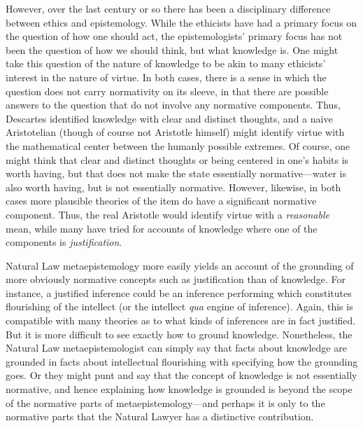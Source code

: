 However, over the last century or so there has been a disciplinary difference between ethics and epistemology. While the ethicists
have had a primary focus on the question of how one should act, the epistemologists' primary focus has not been the question of 
how we should think, but what knowledge is. One might take this question of the nature of knowledge to be akin to many ethicists' 
interest in the nature of virtue. In both cases, there is a sense in which the question does not carry normativity on its sleeve,
in that there are possible answers to the question that do not involve any normative components. Thus, Descartes identified knowledge
with clear and distinct thoughts, and a naive Aristotelian (though of course not Aristotle himself) might identify virtue with the 
mathematical center between the humanly possible extremes. Of course, one might think that clear and distinct
thoughts or being centered in one's habits is worth
having, but that does not make the state essentially normative---water is also worth having, but is not essentially normative.
However, likewise, in both cases more plausible theories of the item do have a significant normative component. Thus, the real 
Aristotle would identify virtue with a \textit{reasonable} mean, while many have tried for accounts of knowledge where one of the
components is \textit{justification}. 

Natural Law metaepistemology more easily yields an account of the grounding of more obviously normative concepts such as 
justification than of knowledge. For instance, a justified inference could be an inference performing which constitutes flourishing of the intellect
(or the intellect \textit{qua} engine of inference). Again, this is compatible with many theories as to what kinds of inferences
are in fact justified. But it is more difficult to see exactly how to ground knowledge. Nonetheless, the Natural Law metaepistemologist
can simply say that facts about knowledge are grounded in facts about intellectual flourishing with specifying how the grounding
goes.  Or they might punt and say that the concept of knowledge is not essentially normative, and hence explaining how knowledge is
grounded is beyond the scope of the normative parts of metaepistemology---and perhaps it is only to the normative parts that the
Natural Lawyer has a distinctive contribution.

